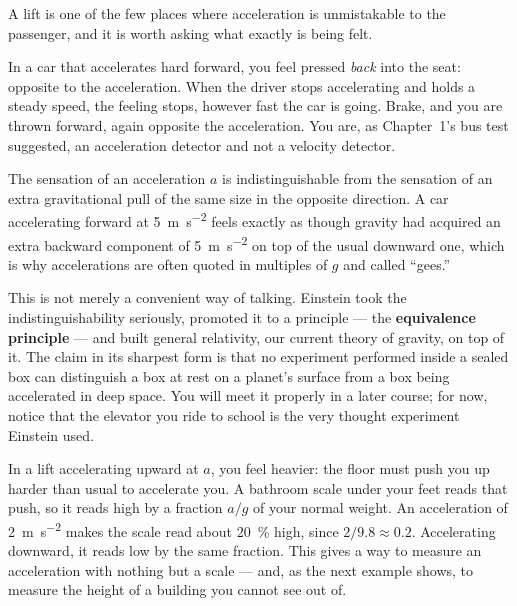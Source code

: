 \documentclass[11pt,twoside,openany]{book}
\begin{document}
A lift is one of the few places where acceleration is unmistakable to the passenger, and it is worth asking what exactly is being felt.

In a car that accelerates hard forward, you feel pressed \emph{back} into the seat: opposite to the acceleration. When the driver stops accelerating and holds a steady speed, the feeling stops, however fast the car is going. Brake, and you are thrown forward, again opposite the acceleration. You are, as Chapter~1's bus test suggested, an acceleration detector and not a velocity detector.

\begin{modelnote}
The sensation of an acceleration $a$ is indistinguishable from the sensation of an extra gravitational pull of the same size in the opposite direction. A car accelerating forward at \SI{5}{\metre\per\second\squared} feels exactly as though gravity had acquired an extra backward component of \SI{5}{\metre\per\second\squared} on top of the usual downward one, which is why accelerations are often quoted in multiples of $g$ and called ``gees.''

This is not merely a convenient way of talking. Einstein took the indistinguishability seriously, promoted it to a principle --- the \textbf{equivalence principle} --- and built general relativity, our current theory of gravity, on top of it. The claim in its sharpest form is that no experiment performed inside a sealed box can distinguish a box at rest on a planet's surface from a box being accelerated in deep space. You will meet it properly in a later course; for now, notice that the elevator you ride to school is the very thought experiment Einstein used.
\end{modelnote}

In a lift accelerating upward at $a$, you feel heavier: the floor must push you up harder than usual to accelerate you. A bathroom scale under your feet reads that push, so it reads high by a fraction $a/g$ of your normal weight. An acceleration of \SI{2}{\metre\per\second\squared} makes the scale read about \SI{20}{\percent} high, since $2/9.8 \approx 0.2$. Accelerating downward, it reads low by the same fraction. This gives a way to measure an acceleration with nothing but a scale --- and, as the next example shows, to measure the height of a building you cannot see out of.
\end{document}
